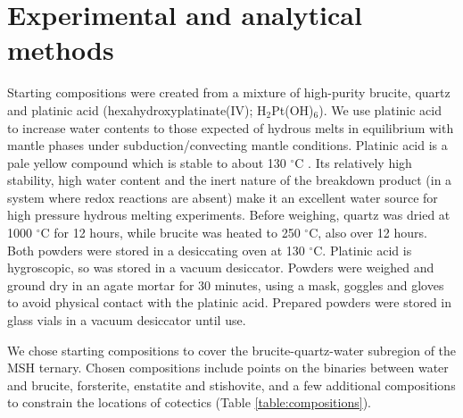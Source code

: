 \documentclass[review]{elsarticle}
\begin{document}
\section{Experimental and analytical methods}
Starting compositions were created from a mixture of high-purity brucite, quartz and platinic acid (hexahydroxyplatinate(IV); H$_2$Pt(OH)$_6$). We use platinic acid to increase water contents to those expected of hydrous melts in equilibrium with mantle phases under subduction/convecting mantle conditions. Platinic acid is a pale yellow compound which is stable to about 130 $^{\circ}$C \citep{Nagano2002}. Its relatively high stability, high water content and the inert nature of the breakdown product (in a system where redox reactions are absent) make it an excellent water source for high pressure hydrous melting experiments. Before weighing, quartz was dried at 1000 $^{\circ}$C for 12 hours, while brucite was heated to 250 $^{\circ}$C, also over 12 hours. Both powders were stored in a desiccating oven at 130 $^{\circ}$C. Platinic acid is hygroscopic, so was stored in a vacuum desiccator. Powders were weighed and ground dry in an agate mortar for 30 minutes, using a mask, goggles and gloves to avoid physical contact with the platinic acid. Prepared powders were stored in glass vials in a vacuum desiccator until use.

We chose starting compositions to cover the brucite-quartz-water subregion of the MSH ternary. Chosen compositions include points on the binaries between water and brucite, forsterite, enstatite and stishovite, and a few additional compositions to constrain the locations of cotectics (Table \ref{table:compositions}).
\end{document}

